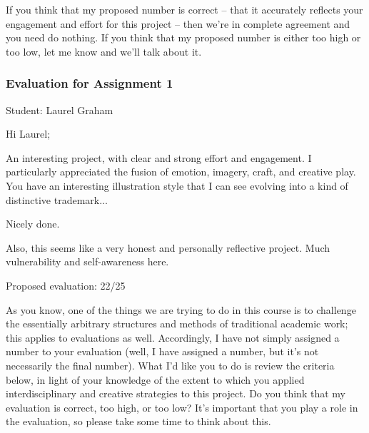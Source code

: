 \documentclass[letterpaper,10pt,DIV=9,headsepline]{scrreprt}
\begin{document}
If you think that my proposed number is correct -- that it accurately
reflects your engagement and effort for this project -- then we're in
complete agreement and you need do nothing. If you think that my
proposed number is either too high or too low, let me know and we'll
talk about it.

\newpage

\subsubsection{Evaluation for Assignment 1}

Student: Laurel Graham

\bigskip
Hi Laurel;

An interesting project, with clear and strong effort and engagement. I
particularly appreciated the fusion of emotion, imagery, craft, and
creative play. You have an interesting illustration style that I can see evolving into a kind of distinctive trademark...

Nicely done.

Also, this seems like a very honest and personally reflective project.
Much vulnerability and self-awareness here.



\bigskip
Proposed evaluation: 22/25

\bigskip
As you know, one of the things we are trying to do in this course is
to challenge the essentially arbitrary structures and methods of
traditional academic work; this applies to evaluations as well.
Accordingly, I have not simply assigned a number to your evaluation
(well, I have assigned a number, but it's not necessarily the final
number). What I'd like you to do is review the criteria below, in
light of your knowledge of the extent to which you applied
interdisciplinary and creative strategies to this project. Do you
think that my evaluation is correct, too high, or too low? It's
important that you play a role in the evaluation, so please take some
time to think about this.
\end{document}
